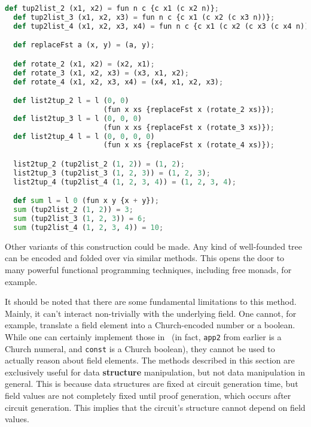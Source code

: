 \begin{lstlisting}[language=Python]
  def tup2list_2 (x1, x2) = fun n c {c x1 (c x2 n)};
  def tup2list_3 (x1, x2, x3) = fun n c {c x1 (c x2 (c x3 n))};
  def tup2list_4 (x1, x2, x3, x4) = fun n c {c x1 (c x2 (c x3 (c x4 n)))};

  def replaceFst a (x, y) = (a, y);

  def rotate_2 (x1, x2) = (x2, x1);
  def rotate_3 (x1, x2, x3) = (x3, x1, x2);
  def rotate_4 (x1, x2, x3, x4) = (x4, x1, x2, x3);

  def list2tup_2 l = l (0, 0) 
                       (fun x xs {replaceFst x (rotate_2 xs)});
  def list2tup_3 l = l (0, 0, 0) 
                       (fun x xs {replaceFst x (rotate_3 xs)});
  def list2tup_4 l = l (0, 0, 0, 0) 
                       (fun x xs {replaceFst x (rotate_4 xs)});

  list2tup_2 (tup2list_2 (1, 2)) = (1, 2);
  list2tup_3 (tup2list_3 (1, 2, 3)) = (1, 2, 3);
  list2tup_4 (tup2list_4 (1, 2, 3, 4)) = (1, 2, 3, 4);

  def sum l = l 0 (fun x y {x + y});
  sum (tup2list_2 (1, 2)) = 3;
  sum (tup2list_3 (1, 2, 3)) = 6;
  sum (tup2list_4 (1, 2, 3, 4)) = 10;
\end{lstlisting}

Other variants of this construction could be made. Any kind of well-founded tree can be encoded and folded over via similar methods. This opens the door to many powerful functional programming techniques, including free monads, for example.

It should be noted that there are some fundamental limitations to this method. Mainly, it can't interact non-trivially with the underlying field. One cannot, for example, translate a field element into a Church-encoded number or a boolean. While one can certainly implement those in \vampir\ (in fact, \lstinline|app2| from earlier is a Church numeral, and \lstinline|const| is a Church boolean), they cannot be used to actually reason about field elements. The methods described in this section are exclusively useful for data \textbf{structure} manipulation, but not data manipulation in general. This is because data structures are fixed at circuit generation time, but field values are not completely fixed until proof generation, which occurs after circuit generation. This implies that the circuit's structure cannot depend on field values.